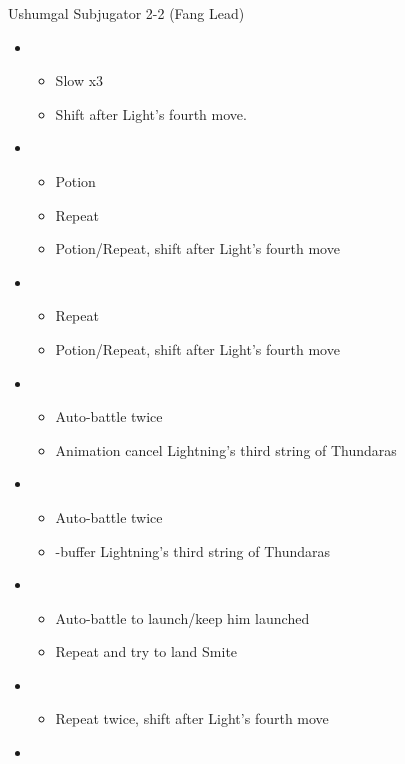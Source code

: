 \begin{multicols}{2}
\begin{battle}{Ushumgal Subjugator 2-2 (Fang Lead)}
\begin{itemize}
    \item \third
    \begin{itemize}
        \item Slow x3
        \item Shift after Light's fourth move.
    \end{itemize}
    \item \fifth
    \begin{itemize}
        \item Potion
        \item Repeat
        \item Potion/Repeat, shift after Light's fourth move
    \end{itemize}
    \item \third
    \begin{itemize}
        \item Repeat
        \item Potion/Repeat, shift after Light's fourth move
    \end{itemize}
    \item \second
    \begin{itemize}
        \item Auto-battle twice
        \item Animation cancel Lightning's third string of Thundaras
    \end{itemize}
    \item \sixth
    \begin{itemize}
        \item Auto-battle twice
        \item \com-buffer Lightning's third string of Thundaras
    \end{itemize}
    \item \first
    \begin{itemize}
        \item Auto-battle to launch/keep him launched
        \item Repeat and try to land Smite
    \end{itemize}
    \item \third
    \begin{itemize}
        \item Repeat twice, shift after Light's fourth move
    \end{itemize}
    \item \fourth

\end{itemize}
\end{battle}
\end{multicols}
